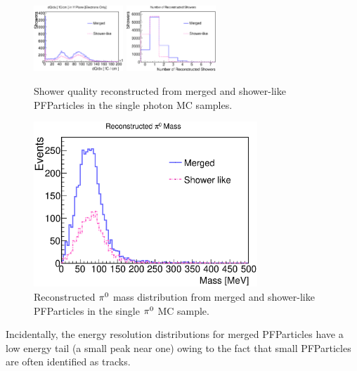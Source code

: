 \begin{figure}[htbp]
\begin{center}
\includegraphics[width=0.3\textwidth]{figs/ongoing/gamma/dQdxY.eps}
\includegraphics[width=0.3\textwidth]{figs/ongoing/gamma/NRecoShowers.eps}
\caption{Shower quality reconstructed from merged and shower-like PFParticles
in the single photon MC samples.}
\label{fig:shr_quality_merged_single_gamma}
\end{center}
\end{figure}
\begin{figure}[htbp]
\begin{center}
\includegraphics[width=0.75\textwidth]{figs/ongoing/pi0/RecoPi0Mass.eps}
\caption{Reconstructed ${\pi}^0$ mass distribution from merged and
shower-like PFParticles in the single ${\pi}^0$ MC sample.}
\label{fig:mpi0_merged_single_pi0}
\end{center}
\end{figure}
Incidentally,
the energy resolution distributions for merged PFParticles have a 
low energy tail (a small peak near one) owing to the fact that
small PFParticles are often identified as tracks.\\

